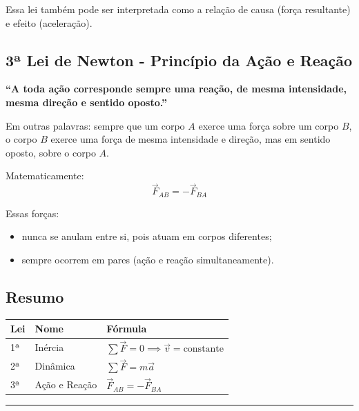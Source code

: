 Essa lei também pode ser interpretada como a relação de causa (força resultante) e efeito (aceleração).

\subsection*{3ª Lei de Newton - Princípio da Ação e Reação}

\textbf{``A toda ação corresponde sempre uma reação, de mesma intensidade, mesma direção e sentido oposto.''}

Em outras palavras: sempre que um corpo \( A \) exerce uma força sobre um corpo \( B \), o corpo \( B \) exerce uma força de mesma intensidade e direção, mas em sentido oposto, sobre o corpo \( A \).

Matematicamente:
\[
\vec{F}_{AB} = -\vec{F}_{BA}
\]

Essas forças:
\begin{itemize}
    \item nunca se anulam entre si, pois atuam em corpos diferentes;
    \item sempre ocorrem em pares (ação e reação simultaneamente).
\end{itemize}

\subsection*{Resumo}

\begin{center}
\begin{tabular}{lll}
\toprule
\textbf{Lei} & \textbf{Nome} & \textbf{Fórmula} \\
\midrule
1ª & Inércia & \( \sum \vec{F} = 0 \implies \vec{v} = \text{constante} \) \\
2ª & Dinâmica & \( \sum \vec{F} = m \vec{a} \) \\
3ª & Ação e Reação & \( \vec{F}_{AB} = -\vec{F}_{BA} \) \\
\bottomrule
\end{tabular}
\end{center}

\noindent\rule{\linewidth}{0.6pt}\\

